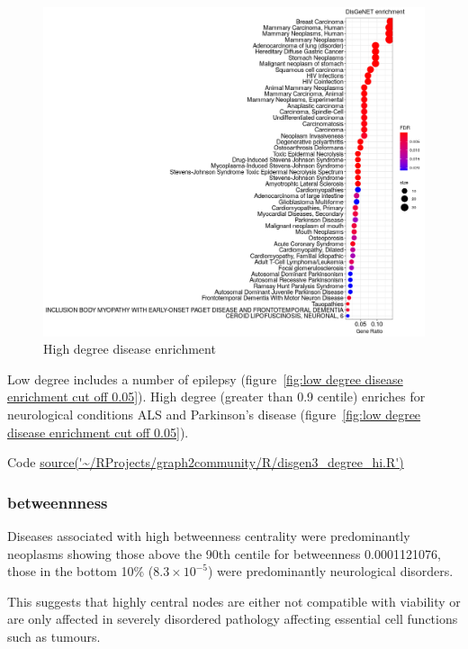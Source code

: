 \begin{figure}
    \centering
    \includegraphics[width=\textwidth]{images/Rplot_high_deg_0point9_0point05cutoff_disgen.png}
    \caption{High degree disease enrichment}
    \label{fig:High degree disease enrichment cut off 0.05}
\end{figure}
Low degree includes a number of epilepsy (figure~\ref{fig:low degree disease enrichment cut off 0.05}). High degree (greater than 0.9 centile) enriches for neurological conditions ALS and Parkinson's disease (figure~\ref{fig:low degree disease enrichment cut off 0.05}).


Code \url{source('~/RProjects/graph2community/R/disgen3_degree_hi.R')}
\subsubsection{betweennness}



Diseases associated with high betweenness centrality were predominantly neoplasms showing those above the 90th centile for betweenness 0.0001121076, those in the bottom 10\% ($8.3 \times 10^{-5}$) were predominantly neurological disorders.

This suggests that highly central nodes are either not compatible with viability or are only affected in severely disordered pathology affecting essential cell functions such as tumours. 



